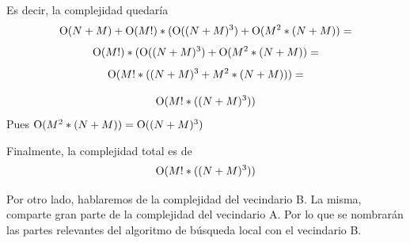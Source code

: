        Es decir, la complejidad quedaría
        \[
            \operatorname{O}(N+M) + \operatorname{O}(M!)*(\operatorname{O}((N+M)^{3}) + \operatorname{O}(M^{2}*(N+M)) =
        \]
        \[
            \operatorname{O}(M!)*(\operatorname{O}((N+M)^{3}) + \operatorname{O}(M^{2}*(N+M)) =
        \]
        \[
            \operatorname{O}(M!*((N+M)^{3} + M^{2}*(N+M))) =
        \]

        \[
            \operatorname{O}(M!*((N+M)^{3}))
        \]
        Pues $\operatorname{O}(M^{2}*(N+M)) = \operatorname{O}((N+M)^{3})$

        Finalmente, la complejidad total es de
        \[
            \operatorname{O}(M!*((N+M)^{3}))
        \] 


        \par Por otro lado, hablaremos de la complejidad del vecindario B. La misma, comparte gran parte de la complejidad del vecindario A. Por lo que se nombrarán las partes relevantes del algoritmo de búsqueda local con el vecindario B.
